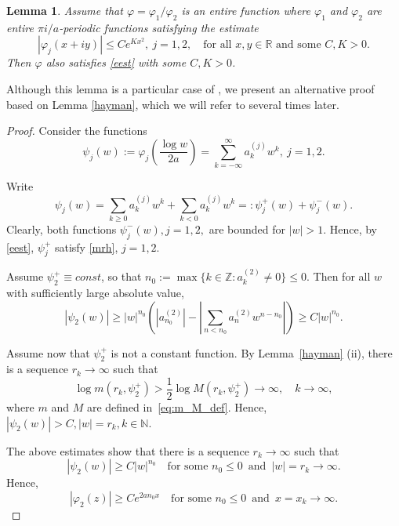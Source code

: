 \documentclass[12pt]{amsart}
\numberwithin{equation}{section}
\theoremstyle{plain}
\newtheorem{lemma}[theorem]{Lemma}
\theoremstyle{definition}
\newcommand{\R}{{\mathbb R}} \newcommand{\Q}{{\mathbb Q}} \newcommand{\Z}{{\mathbb Z}} \newcommand{\N}{{\mathbb N}}
\begin{document}
\begin{lemma}\label{c24}
    Assume that $\varphi=\varphi_1/\varphi_2$ is an entire function where  $\varphi_1$ and $\varphi_2$ are  entire $\pi i/a$-periodic functions satisfying the estimate \begin{equation}\label{eest}
    |\varphi_j(x+iy)|\leq Ce^{K x^2}, \ j=1,2, \quad \text{for all } x,y\in\R \text{ and  some } C,K>0.\end{equation}
    Then  $\varphi$ also satisfies \eqref{eest} with some $C,K>0$.
    \end{lemma}

Although this lemma is a particular case of \cite[Theorem 1 in Lecture 2]{MR1400006}, we present an alternative proof based on Lemma \ref{hayman}, which we will refer to several times later.

\begin{proof}
 Consider the functions 
 $$\psi_j(w):=\varphi_j\left(\frac{\log w}{2a}\right)=\sum_{k=-\infty}^\infty a_k^{(j)} w^k,\ j=1,2.$$  

 Write $$\psi_j(w)=\sum_{k\geq 0}a_k^{(j)} w^k+\sum_{k<0}a_k^{(j)}w^k=:\psi_j^+(w)+\psi_j^-(w).$$ 
 Clearly,  both functions $\psi_j^-(w),j=1,2,$  are bounded for $|w|> 1.$ Hence, by \eqref{eest}, $\psi_j^+$ satisfy \eqref{mrh}, $j=1,2$. 

  Assume  $\psi_2^+ \equiv const$, so that  $n_0:=\max\{k\in\mathbb Z: a_k^{(2)}\ne0\}\leq0$. Then for all $w$ with sufficiently large absolute value, 
 $$|\psi_2(w)| \geq |w|^{n_0}\left(|a^{(2)}_{n_0}| - \left|\sum\limits_{n < n_0} a^{(2)}_n w^{n-n_0} \right|\right) \geq C |w|^{n_0}.$$ 

  Assume now that $\psi_2^+$ is not a constant function.  
By Lemma~\ref{hayman} (ii), there is a sequence $r_k\to\infty$ such that
$$
\log m(r_k,\psi^+_2) > \frac{1}{2}\log M(r_k, \psi^{+}_2)\to\infty,\quad k\to\infty,$$
where $m$ and $M$ are defined in~\eqref{eq:m_M_def}. Hence, $|\psi_2(w)|>C, |w|=r_k,k\in\N.$


The above estimates show  that there is a sequence $r_k\to\infty$ such that \begin{equation}\label{ppsi}
    |\psi_2(w)|\geq C|w|^{n_0}\quad \text{for some } n_0\leq 0 \, \text{ and } \, |w|=r_k\to\infty.
\end{equation}Hence,
\begin{equation}\label{pvsi}
    |\varphi_2(z)|\geq Ce^{2an_0x}\quad \text{for some } n_0\leq0 \, \text{ and } \, x=x_k\to\infty.
\end{equation}



\end{proof}
\end{document}
